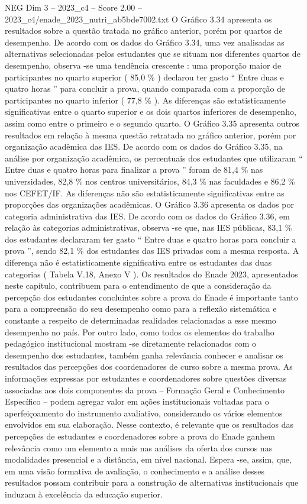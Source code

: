 \begin{textsample}{NEG Dim 3 – 2023\_c4 – Score 2.00 – 2023\_c4/enade\_2023\_nutri\_ab5bde7002.txt}
O Gráfico 3.34 apresenta os resultados sobre a questão tratada no gráfico anterior, porém por quartos de desempenho.
De acordo com os dados do Gráfico 3.34, uma vez analisadas as alternativas selecionadas pelos estudantes que se situam nos diferentes quartos de desempenho, observa -se uma tendência crescente : uma proporção maior de participantes no quarto superior ( 85,0 \% ) declarou ter gasto “ Entre duas e quatro horas ” para concluir a prova, quando comparada com a proporção de participantes no quarto inferior ( 77,8 \% ).
As diferenças são estatisticamente significativas entre o quarto superior e os dois quartos inferiores de desempenho, assim como entre o primeiro e o segundo quarto.
O Gráfico 3.35 apresenta outros resultados em relação à mesma questão retratada no gráfico anterior, porém por organização acadêmica das IES.
De acordo com os dados do Gráfico 3.35, na análise por organização acadêmica, os percentuais dos estudantes que utilizaram “ Entre duas e quatro horas para finalizar a prova ” foram de 81,4 \% nas universidades, 82,8 \% nos centros universitários, 84,3 \% nas faculdades e 86,2 \% nos CEFET/IF.
As diferenças não são estatisticamente significativas entre as proporções das organizações acadêmicas.
O Gráfico 3.36 apresenta os dados por categoria administrativa das IES.
De acordo com os dados do Gráfico 3.36, em relação às categorias administrativas, observa -se que, nas IES públicas, 83,1 \% dos estudantes declararam ter gasto “ Entre duas e quatro horas para concluir a prova ”, sendo 82,1 \% dos estudantes das IES privadas com a mesma resposta.
A diferença não é estatisticamente significativa entre os estudantes das duas categorias ( Tabela V.18, Anexo V ).
Os resultados do Enade 2023, apresentados neste capítulo, contribuem para o entendimento de que a consideração da percepção dos estudantes concluintes sobre a prova do Enade é importante tanto para a compreensão do seu desempenho como para a reflexão sistemática e constante a respeito de determinadas realidades relacionadas a esse mesmo desempenho no país.
Por outro lado, como todos os elementos do trabalho pedagógico institucional mostram -se diretamente relacionados com o desempenho dos estudantes, também ganha relevância conhecer e analisar os resultados das percepções dos coordenadores de curso sobre a mesma prova.
As informações expressas por estudantes e coordenadores sobre questões diversas associadas aos dois componentes da prova – Formação Geral e Conhecimento Específico – podem agregar valor em ações institucionais voltadas para o aperfeiçoamento do instrumento avaliativo, considerando os vários elementos envolvidos em sua elaboração.
Nesse contexto, é relevante que os resultados das percepções de estudantes e coordenadores sobre a prova do Enade ganhem relevância como um elemento a mais nas análises da oferta dos cursos nas modalidades presencial e a distância, em nível nacional.
Espera -se, assim, que, em uma visão formativa de avaliação, o conhecimento e a análise desses resultados possam contribuir para a construção de alternativas institucionais que induzam à excelência da educação superior.

\end{textsample}
